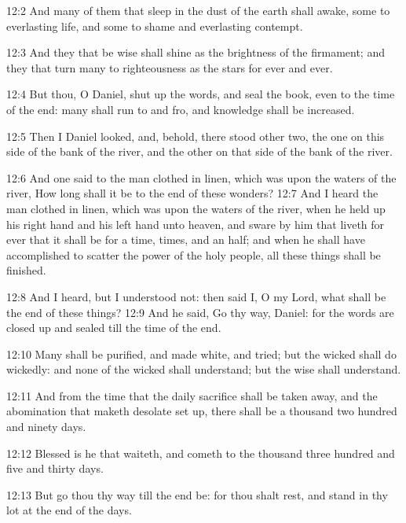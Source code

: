 12:2 And many of them that sleep in the dust of the earth shall awake,
some to everlasting life, and some to shame and everlasting contempt.

12:3 And they that be wise shall shine as the brightness of the
firmament; and they that turn many to righteousness as the stars for
ever and ever.

12:4 But thou, O Daniel, shut up the words, and seal the book, even to
the time of the end: many shall run to and fro, and knowledge shall be
increased.

12:5 Then I Daniel looked, and, behold, there stood other two, the one
on this side of the bank of the river, and the other on that side of
the bank of the river.

12:6 And one said to the man clothed in linen, which was upon the
waters of the river, How long shall it be to the end of these wonders?
12:7 And I heard the man clothed in linen, which was upon the waters
of the river, when he held up his right hand and his left hand unto
heaven, and sware by him that liveth for ever that it shall be for a
time, times, and an half; and when he shall have accomplished to
scatter the power of the holy people, all these things shall be
finished.

12:8 And I heard, but I understood not: then said I, O my Lord, what
shall be the end of these things?  12:9 And he said, Go thy way,
Daniel: for the words are closed up and sealed till the time of the
end.

12:10 Many shall be purified, and made white, and tried; but the
wicked shall do wickedly: and none of the wicked shall understand; but
the wise shall understand.

12:11 And from the time that the daily sacrifice shall be taken away,
and the abomination that maketh desolate set up, there shall be a
thousand two hundred and ninety days.

12:12 Blessed is he that waiteth, and cometh to the thousand three
hundred and five and thirty days.

12:13 But go thou thy way till the end be: for thou shalt rest,
and stand in thy lot at the end of the days.

